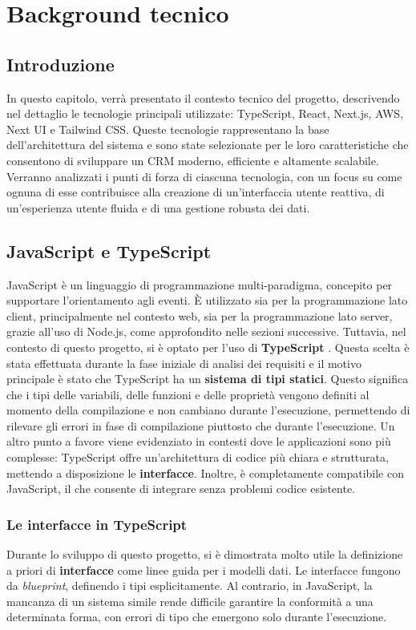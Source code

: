 \documentclass[target=bach,aauheader=,style=]{thud}
\begin{document}
\chapter{Background tecnico}

\section{Introduzione}
In questo capitolo, verrà presentato il contesto tecnico del progetto, descrivendo nel dettaglio le tecnologie principali utilizzate: TypeScript, React, Next.js, AWS, Next UI e Tailwind CSS. Queste tecnologie rappresentano la base dell'architettura del sistema e sono state selezionate per le loro caratteristiche che consentono di sviluppare un CRM moderno, efficiente e altamente scalabile. Verranno analizzati i punti di forza di ciascuna tecnologia, con un focus su come ognuna di esse contribuisce alla creazione di un'interfaccia utente reattiva, di un'esperienza utente fluida e di una gestione robusta dei dati.

\section{JavaScript e TypeScript}
JavaScript \cite{wikipedia:javascript} è un linguaggio di programmazione multi-paradigma, concepito per supportare l'orientamento agli eventi. È utilizzato sia per la programmazione lato client, principalmente nel contesto web, sia per la programmazione lato server, grazie all'uso di Node.js, come approfondito nelle sezioni successive. Tuttavia, nel contesto di questo progetto, si è optato per l'uso di \textbf{TypeScript} \cite{wikipedia:typescript}. Questa scelta è stata effettuata durante la fase iniziale di analisi dei requisiti e il motivo principale è stato che TypeScript ha un \textbf{sistema di tipi statici}. Questo significa che i tipi delle variabili, delle funzioni e delle proprietà vengono definiti al momento della compilazione e non cambiano durante l'esecuzione, permettendo di rilevare gli errori in fase di compilazione piuttosto che durante l'esecuzione. Un altro punto a favore viene evidenziato in contesti dove le applicazioni sono più complesse: TypeScript offre un'architettura di codice più chiara e strutturata, mettendo a disposizione le \textbf{interfacce}. Inoltre, è completamente compatibile con JavaScript, il che consente di integrare senza problemi codice esistente.

\subsection{Le interfacce in TypeScript}
Durante lo sviluppo di questo progetto, si è dimostrata molto utile la definizione a priori di \textbf{interfacce} come linee guida per i modelli dati. Le interfacce fungono da \textit{blueprint}, definendo i tipi esplicitamente. Al contrario, in JavaScript, la mancanza di un sistema simile rende difficile garantire la conformità a una determinata forma, con errori di tipo che emergono solo durante l'esecuzione.
\end{document}
